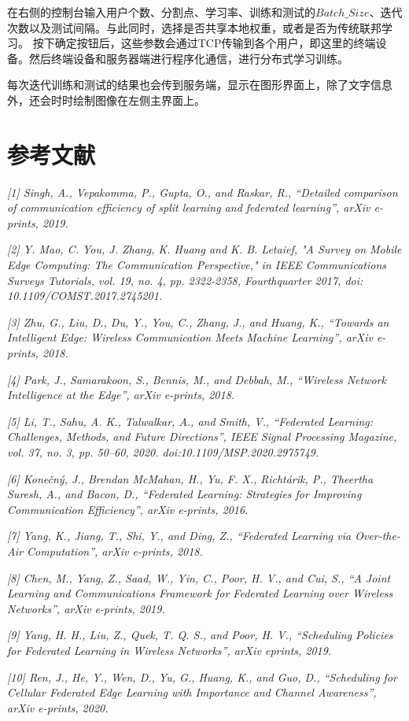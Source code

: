 \documentclass{article}
\begin{document}
在右侧的控制台输入用户个数、分割点、学习率、训练和测试的$Batch\_Size$、迭代次数以及测试间隔。与此同时，选择是否共享本地权重，或者是否为传统联邦学习。
按下确定按钮后，这些参数会通过TCP传输到各个用户，即这里的终端设备。然后终端设备和服务器端进行程序化通信，进行分布式学习训练。

每次迭代训练和测试的结果也会传到服务端，显示在图形界面上，除了文字信息外，还会时时绘制图像在左侧主界面上。

\section{参考文献}
    \textit{[1] Singh, A., Vepakomma, P., Gupta, O., and Raskar, R., “Detailed comparison of communication efficiency of split learning and federated learning”, arXiv e-prints, 2019.}
    
    \textit{[2] Y. Mao, C. You, J. Zhang, K. Huang and K. B. Letaief, "A Survey on Mobile Edge Computing: The Communication Perspective," in IEEE Communications Surveys Tutorials, vol. 19, no. 4, pp. 2322-2358, Fourthquarter 2017, doi: 10.1109/COMST.2017.2745201.}
    
    \textit{[3] Zhu, G., Liu, D., Du, Y., You, C., Zhang, J., and Huang, K., “Towards an Intelligent Edge: Wireless Communication Meets Machine Learning”, arXiv e-prints, 2018.}
    
    \textit{[4] Park, J., Samarakoon, S., Bennis, M., and Debbah, M., “Wireless Network Intelligence at the Edge”, arXiv e-prints, 2018.}
    
    \textit{[5] Li, T., Sahu, A. K., Talwalkar, A., and Smith, V., “Federated Learning: Challenges, Methods, and Future Directions”, IEEE Signal Processing Magazine, vol. 37, no. 3, pp. 50–60, 2020. doi:10.1109/MSP.2020.2975749.}
    
    \textit{[6] Konečný, J., Brendan McMahan, H., Yu, F. X., Richtárik, P., Theertha Suresh, A., and Bacon, D., “Federated Learning: Strategies for Improving Communication Efficiency”, arXiv e-prints, 2016.}
    
    \textit{[7] Yang, K., Jiang, T., Shi, Y., and Ding, Z., “Federated Learning via Over-the-Air Computation”, arXiv e-prints, 2018.}
    
    \textit{[8] Chen, M., Yang, Z., Saad, W., Yin, C., Poor, H. V., and Cui, S., “A Joint Learning and Communications Framework for Federated Learning over Wireless Networks”, arXiv e-prints, 2019.}
    
    \textit{[9] Yang, H. H., Liu, Z., Quek, T. Q. S., and Poor, H. V., “Scheduling Policies for Federated Learning in Wireless Networks”, arXiv eprints, 2019.}
    
    \textit{[10] Ren, J., He, Y., Wen, D., Yu, G., Huang, K., and Guo, D., “Scheduling for Cellular Federated Edge Learning with Importance and Channel Awareness”, arXiv e-prints, 2020.}
\end{document}
